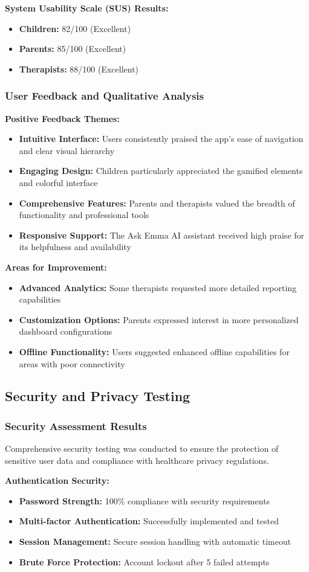\documentclass[12pt,a4paper]{article}
\newcommand{\sectiontitle}[1]{\subsection{#1}}
\newcommand{\subsectiontitle}[1]{\subsubsection{#1}}
\begin{document}
\textbf{System Usability Scale (SUS) Results:}
\begin{itemize}
    \item \textbf{Children:} 82/100 (Excellent)
    \item \textbf{Parents:} 85/100 (Excellent)
    \item \textbf{Therapists:} 88/100 (Excellent)
\end{itemize}

\subsectiontitle{User Feedback and Qualitative Analysis}

\textbf{Positive Feedback Themes:}
\begin{itemize}
    \item \textbf{Intuitive Interface:} Users consistently praised the app's ease of navigation and clear visual hierarchy
    \item \textbf{Engaging Design:} Children particularly appreciated the gamified elements and colorful interface
    \item \textbf{Comprehensive Features:} Parents and therapists valued the breadth of functionality and professional tools
    \item \textbf{Responsive Support:} The Ask Emma AI assistant received high praise for its helpfulness and availability
\end{itemize}

\textbf{Areas for Improvement:}
\begin{itemize}
    \item \textbf{Advanced Analytics:} Some therapists requested more detailed reporting capabilities
    \item \textbf{Customization Options:} Parents expressed interest in more personalized dashboard configurations
    \item \textbf{Offline Functionality:} Users suggested enhanced offline capabilities for areas with poor connectivity
\end{itemize}

\sectiontitle{Security and Privacy Testing}

\subsectiontitle{Security Assessment Results}

Comprehensive security testing was conducted to ensure the protection of sensitive user data and compliance with healthcare privacy regulations.

\textbf{Authentication Security:}
\begin{itemize}
    \item \textbf{Password Strength:} 100\% compliance with security requirements
    \item \textbf{Multi-factor Authentication:} Successfully implemented and tested
    \item \textbf{Session Management:} Secure session handling with automatic timeout
    \item \textbf{Brute Force Protection:} Account lockout after 5 failed attempts
\end{itemize}
\end{document}
